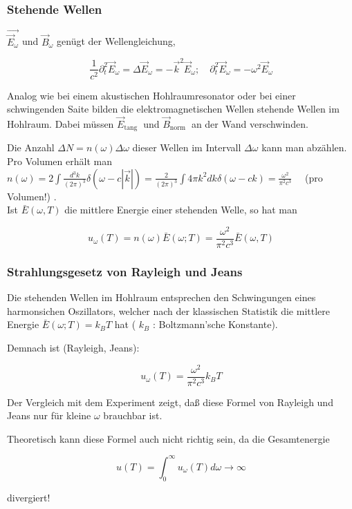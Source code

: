 \documentclass[10pt, letterpaper]{article}
\begin{document}
\subsubsection*{Stehende Wellen}
$\overrightarrow{\vec{E}_{\omega}}$ und $\vec{B}_{\omega}$ genügt der Wellengleichung,

$$
\frac{1}{c^{2}} \partial_{t}^{2} \vec{E}_{\omega}=\Delta \vec{E}_{\omega}=-\vec{k}^{2} \vec{E}_{\omega} ; \quad \partial_{t}^{2} \vec{E}_{\omega}=-\omega^{2} \vec{E}_{\omega}
$$

Analog wie bei einem akustischen Hohlraumresonator oder bei einer schwingenden Saite bilden die elektromagnetischen Wellen stehende Wellen im Hohlraum. Dabei müssen $\vec{E}_{\text {tang }}$ und $\vec{B}_{\text {norm }}$ an der Wand verschwinden.

Die Anzahl $\Delta N=n(\omega) \Delta \omega$ dieser Wellen im Intervall $\Delta \omega$ kann man abzählen. Pro Volumen erhält man\\
$n(\omega)=2 \int \frac{d^{3} k}{(2 \pi)^{3}} \delta(\omega-c|\vec{k}|)=\frac{2}{(2 \pi)^{3}} \int 4 \pi k^{2} d k \delta(\omega-c k)=\frac{\omega^{2}}{\pi^{2} c^{3}} \quad$ (pro Volumen!) .\\
Ist $\bar{E}(\omega, T)$ die mittlere Energie einer stehenden Welle, so hat man

$$
u_{\omega}(T)=n(\omega) \bar{E}(\omega ; T)=\frac{\omega^{2}}{\pi^{2} c^{3}} \bar{E}(\omega, T)
$$




\subsubsection*{Strahlungsgesetz von Rayleigh und Jeans}
Die stehenden Wellen im Hohlraum entsprechen den Schwingungen eines harmonsichen Oszillators, welcher nach der klassischen Statistik die mittlere Energie $\bar{E}(\omega ; T)=k_{B} T$ hat ( $k_{B}$ : Boltzmann'sche Konstante).

Demnach ist (Rayleigh, Jeans):

$$
u_{\omega}(T)=\frac{\omega^{2}}{\pi^{2} c^{3}} k_{B} T
$$

Der Vergleich mit dem Experiment zeigt, daß diese Formel von Rayleigh und Jeans nur für kleine $\omega$ brauchbar ist.

Theoretisch kann diese Formel auch nicht richtig sein, da die Gesamtenergie

$$
u(T)=\int_{0}^{\infty} u_{\omega}(T) d \omega \rightarrow \infty
$$

divergiert!
\end{document}
